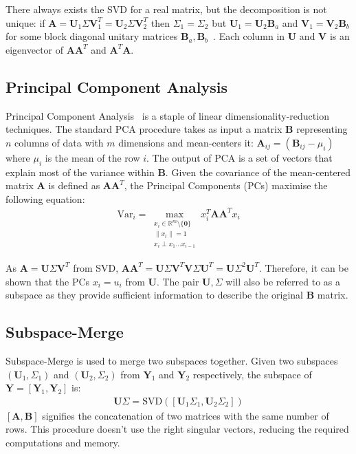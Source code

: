There always exists the SVD for a real matrix, but the decomposition is not
unique: if $\mathbf{A} = \mathbf{U}_1\Sigma\mathbf{V}_1^T =
\mathbf{U}_2\Sigma\mathbf{V}_2^T$ then $\Sigma_1 = \Sigma_2$ but $\mathbf{U}_1 =
\mathbf{U}_2\mathbf{B}_a$ and $\mathbf{V}_1 = \mathbf{V}_2\mathbf{B}_b$ for some
block diagonal unitary matrices $\mathbf{B}_a,
\mathbf{B}_b$~\cite{eftekhari2019moses, Strang2009}. Each column in
$\mathbf{U}$ and $\mathbf{V}$ is an eigenvector of $\mathbf{AA}^T$ and
$\mathbf{A}^T\mathbf{A}$.

\subsection{Principal Component Analysis}
Principal Component Analysis~\cite{pearson1901liii} is a staple of linear
dimensionality-reduction techniques. The standard PCA procedure takes as input a
matrix $\mathbf{B}$ representing $n$ columns of data with $m$ dimensions and
mean-centers it: $\mathbf{A}_{ij} = (\mathbf{B}_{ij} - \mu_i)$ where $\mu_i$ is
the mean of the row $i$. The output of PCA is a set of vectors that explain most
of the variance within $\mathbf{B}$. Given the covariance of the mean-centered
matrix $\mathbf{A}$ is defined as $\mathbf{AA}^T$, the Principal Components
(PCs) maximise the following equation:
\begin{align}
\text{Var}_i = \max_{\substack{x_i \in \mathbb{R}^m \setminus \{\mathbf{0}\} \\
    \|x_i\|=1 \\ x_i \perp x_1 \dots x_{i-1}}} x_i^T \mathbf{A} \mathbf{A}^T x_i
\end{align}

As $\mathbf{A} = \mathbf{U}\Sigma\mathbf{V}^T$ from SVD,
$\mathbf{AA}^T = \mathbf{U}\Sigma\mathbf{V}^T\mathbf{V}\Sigma\mathbf{U}^T =
\mathbf{U}\Sigma^2\mathbf{U}^T$. Therefore, it can be shown that the PCs
$x_i = u_i$ from $\mathbf{U}$. The pair $\mathbf{U}, \Sigma$ will also be
referred to as a subspace as they provide sufficient information to describe the
original $\mathbf{B}$ matrix.

\subsection{Subspace-Merge}
Subspace-Merge is used to merge two subspaces together. Given two subspaces
$(\mathbf{U}_1, \Sigma_1)$ and $(\mathbf{U}_2, \Sigma_2)$ from $\mathbf{Y}_1$ and
$\mathbf{Y}_2$ respectively, the subspace of $\mathbf{Y} = [\mathbf{Y}_1,
\mathbf{Y}_2]$ is:
\begin{align}
    \mathbf{U}\Sigma = \text{SVD}([\mathbf{U}_1\Sigma_1, \mathbf{U}_2\Sigma_2])
\end{align}
$[\mathbf{A}, \mathbf{B}]$ signifies the concatenation of two matrices with the
same number of rows. This procedure doesn't use the right singular vectors,
reducing the required computations and memory.

